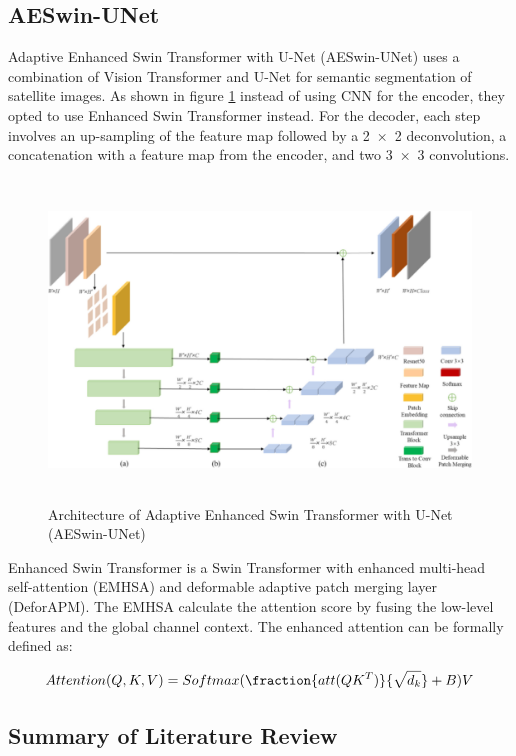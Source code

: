 \subsection{AESwin-UNet}
Adaptive Enhanced Swin Transformer with U-Net (AESwin-UNet) \cite{unet-transformer}  uses a combination of Vision Transformer and U-Net for semantic segmentation of satellite images. As shown in figure \ref{fig:unetswin} instead of using CNN for the encoder, they opted to use Enhanced Swin Transformer instead.  For the decoder, each step involves an up-sampling of the feature map followed by a 2 × 2 deconvolution, a concatenation with a feature map from the encoder, and two 3 × 3 convolutions. 

\FloatBarrier
\begin{figure}[ht]
\includegraphics[width=12.5cm, height=8.5cm]{images/unet-trasnformer.jpg}
\centering
\caption{Architecture of Adaptive Enhanced Swin Transformer with U-Net (AESwin-UNet)}
\label{fig:unetswin}
\end{figure}

Enhanced Swin Transformer is a Swin Transformer  with enhanced multi-head self-attention (EMHSA) and deformable adaptive patch merging layer (DeforAPM). The EMHSA calculate  the attention score by fusing the low-level features and the global channel context. The enhanced attention can be formally defined as:

\begin{equation}
    Attention(Q,K,V) = Softmax(\fraction{att(QK^T)}{\sqrt{d_k}}+B)V
\end{equation}

\subsection{Summary of Literature Review}

